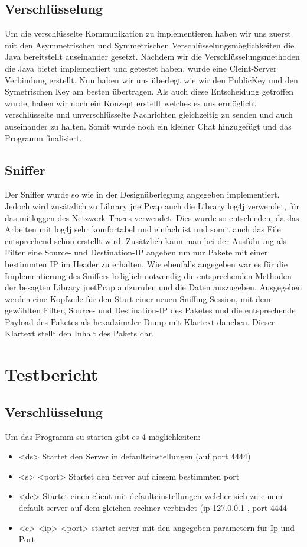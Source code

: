 \documentclass[a4paper,12pt]{scrreprt}
\begin{document}
\section{Verschlüsselung}
Um die verschlüsselte Kommunikation zu implementieren haben wir uns zuerst mit den Asymmetrischen und Symmetrischen Verschlüsselungsmöglichkeiten die Java bereitstellt auseinander gesetzt.
Nachdem wir die Verschlüsselungsmethoden die Java bietet implementiert und getestet haben, wurde eine Cleint-Server Verbindung erstellt. Nun haben wir uns überlegt wie wir den PublicKey und den Symetrischen Key am besten übertragen. 
Als auch diese Entscheidung getroffen wurde, haben wir noch ein Konzept erstellt welches es uns ermöglicht verschlüsselte und unverschlüsselte Nachrichten gleichzeitig zu senden und auch auseinander zu halten.
Somit wurde noch ein kleiner Chat hinzugefügt und das Programm finalisiert.
\section{Sniffer}
	Der Sniffer wurde so wie in der Designüberlegung angegeben implementiert. Jedoch wird zusätzlich zu Library jnetPcap auch die Library log4j verwendet, für das mitloggen des Netzwerk-Traces verwendet. Dies wurde so entschieden, da das Arbeiten mit log4j sehr komfortabel und einfach ist und somit auch das File entsprechend schön erstellt wird. Zusätzlich kann man bei der Ausführung als Filter eine Source- und Destination-IP angeben um nur Pakete mit einer bestimmten IP im Header zu erhalten. Wie ebenfalls angegeben war es für die Implementierung des Sniffers lediglich notwendig die entsprechenden Methoden der besagten Library jnetPcap aufzurufen und die Daten auszugeben. Ausgegeben werden eine Kopfzeile für den Start einer neuen Sniffing-Session, mit dem gewählten Filter, Source- und Destination-IP des Paketes und die entsprechende Payload des Paketes als hexadzimaler Dump mit Klartext daneben. Dieser Klartext stellt den Inhalt des Pakets dar. 
	
\chapter{Testbericht}
\section{Verschlüsselung}
	Um das Programm su starten gibt es 4 möglichkeiten:
	\begin{itemize}
	\item <ds> Startet den Server in defaulteinstellungen (auf port 4444)
	\item <s> <port> Startet den Server auf diesem bestimmten port
	\item <dc> Startet einen client mit defaulteinstellungen welcher sich zu einem default server auf dem gleichen rechner verbindet (ip 127.0.0.1 , port 4444
	\item <c> <ip> <port> startet server mit den angegeben parametern für Ip und Port
	\end{itemize}
	
\end{document}
